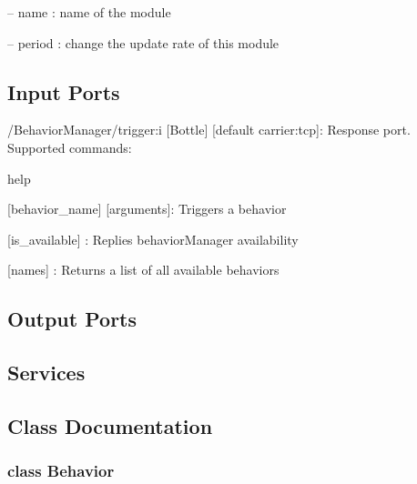 \begin{DoxyItemize}
\item -- name \+: name of the module
\item -- period \+: change the update rate of this module 
\end{DoxyItemize}\hypertarget{group__touchDetector_inputports_sec}{}\subsection{Input Ports}\label{group__touchDetector_inputports_sec}

\begin{DoxyItemize}
\item /\+Behavior\+Manager/trigger\+:i \mbox{[}Bottle\mbox{]} \mbox{[}default carrier\+:tcp\mbox{]}\+: Response port. Supported commands\+:
\begin{DoxyItemize}
\item help
\item \mbox{[}\textquotesingle{}behavior\+\_\+name\textquotesingle{}\mbox{]} \mbox{[}arguments\mbox{]}\+: Triggers a behavior
\item \mbox{[}\textquotesingle{}is\+\_\+available\textquotesingle{}\mbox{]} \+: Replies behavior\+Manager availability
\item \mbox{[}\textquotesingle{}names\textquotesingle{}\mbox{]} \+: Returns a list of all available behaviors
\end{DoxyItemize}
\end{DoxyItemize}\hypertarget{group__touchDetector_outputports_sec}{}\subsection{Output Ports}\label{group__touchDetector_outputports_sec}
\hypertarget{group__touchDetector_services_sec}{}\subsection{Services}\label{group__touchDetector_services_sec}


\subsection{Class Documentation}
\label{classBehavior}
\subsubsection{class Behavior}


